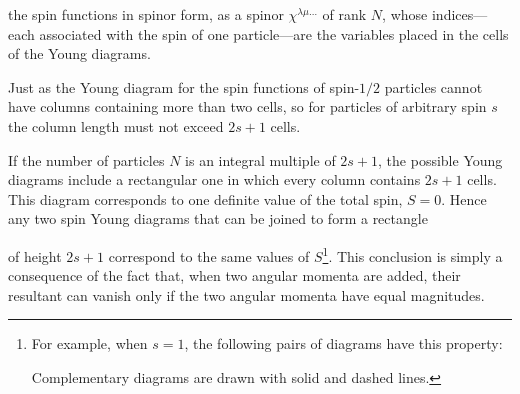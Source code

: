 the spin functions in spinor form, as a spinor $\chi^{\lambda\mu\ldots}$ of rank $N$, whose indices---each associated with the spin of one particle---are the variables placed in the cells of the Young diagrams.

\begin{figure}[ht]
\centering
{}
\par{}
\end{figure}





Just as the Young diagram for the spin functions of spin-$1/2$ particles cannot have columns containing more than two cells, so for particles of arbitrary spin $s$ the column length must not exceed $2s+1$ cells.

If the number of particles $N$ is an integral multiple of $2s+1$, the possible Young diagrams include a rectangular one in which every column contains $2s+1$ cells. This diagram corresponds to one definite value of the total spin, $S=0$. Hence any two spin Young diagrams that can be joined to form a rectangle

of height $2s+1$ correspond to the same values of $S$\footnote{For example, when $s=1$, the following pairs of diagrams have this property:
\begin{center}\end{center}
Complementary diagrams are drawn with solid and dashed lines.}. This conclusion is simply a consequence of the fact that, when two angular momenta are added, their resultant can vanish only if the two angular momenta have equal magnitudes.

